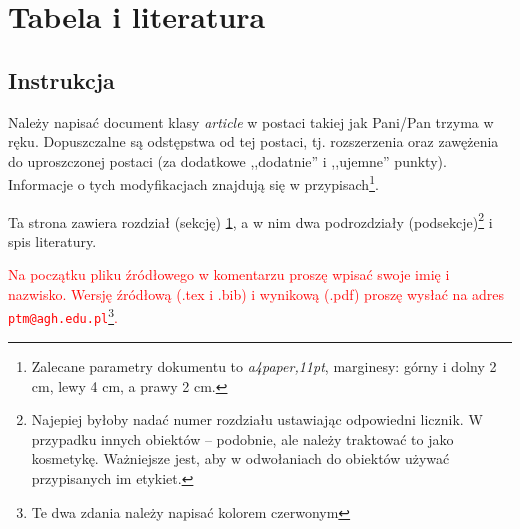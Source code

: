 \documentclass[a4paper,11pt]{article}
\begin{document}
\setcounter{section}{35}
\setcounter{footnote}{7}
\setcounter{table}{14}
\setcounter{page}{151}
	\section{Tabela i literatura}
	\label{rozdzial}
	\subsection{Instrukcja}
	Należy napisać document klasy \textit{article} w postaci takiej jak Pani/Pan trzyma w ręku. Dopuszczalne są odstępstwa od tej postaci, tj. rozszerzenia oraz zawężenia do uproszczonej postaci (za dodatkowe ,,dodatnie'' i ,,ujemne'' punkty). Informacje o tych modyfikacjach znajdują się w przypisach\footnote{Zalecane parametry dokumentu to \textit{a4paper,11pt}, marginesy: górny i dolny 2 cm, lewy 4 cm, a prawy 2 cm.}.
	
	Ta strona zawiera rozdział (sekcję) \ref{rozdzial}, a w nim dwa podrozdziały (podsekcje)\footnote{Najepiej byłoby nadać numer rozdziału ustawiając odpowiedni licznik. W przypadku innych obiektów -- podobnie, ale należy traktować to jako kosmetykę. Ważniejsze jest, aby w odwołaniach do obiektów używać przypisanych im etykiet.} i spis literatury.
	
	\textcolor{red}{
	Na początku pliku źródłowego w komentarzu proszę wpisać swoje imię i nazwisko. Wersję źródłową (.tex i .bib) i wynikową (.pdf) proszę wysłać na adres \texttt{ptm@agh.edu.pl}\footnote{Te dwa zdania należy napisać kolorem czerwonym}.}
	
\end{document}
